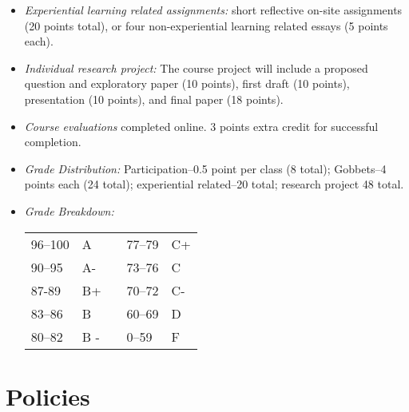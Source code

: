 \documentclass[article,oneside]{memoir}
\begin{document}
\begin{itemize}
\item \textit{Experiential learning related assignments:} short reflective on-site assignments (20 points total), or four non-experiential learning related essays (5 points each). 

\item \textit{Individual research project:} The course project will include a proposed question and exploratory paper (10 points), first draft (10 points), presentation (10 points), and final paper (18 points). 

\item \textit{Course evaluations} completed online. 3 points extra credit for successful completion.

\item \textit{Grade Distribution:} Participation--0.5 point per class (8 total); Gobbets--4 points each (24 total); experiential related--20 total; research project  48 total.

\item \textit{Grade Breakdown:}

 \begin{tabular}{ | l | l | p{2cm} | l | l | }
    \hline 
96--100 & A  & &  77--79 &  C+ \\  
90--95 & A- & &  73--76 & C \\
87-89 & B+ &  &  70--72 & C- \\ 
83--86 & B  & &  60--69 & D\\
80--82 & B - & & 0--59 & F\\ \hline
    \end{tabular}


\end{itemize}





\section{Policies}
\end{document}
